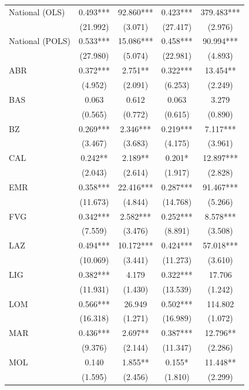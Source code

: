\documentclass[12pt]{article}
\begin{document}
\begin{appendices}
\begin{longtable}{@{}lcccc@{}}
            National (OLS) & 0.493*** & 92.860*** & 0.423*** & 379.483*** \\ 
             & (21.992) & (3.071) & (27.417) & (2.976) \\ 
            National (POLS) & 0.533*** & 15.086*** & 0.458*** & 90.994*** \\ 
             & (27.980) & (5.074) & (22.981) & (4.893) \\ 
            ABR & 0.372*** & 2.751** & 0.322*** & 13.454** \\ 
             & (4.952) & (2.091) & (6.253) & (2.249) \\ 
            BAS & 0.063 & 0.612 & 0.063 & 3.279 \\ 
             & (0.565) & (0.772) & (0.615) & (0.890) \\ 
            BZ & 0.269*** & 2.346*** & 0.219*** & 7.117*** \\ 
             & (3.467) & (3.683) & (4.175) & (3.961) \\ 
            CAL & 0.242** & 2.189** & 0.201* & 12.897*** \\ 
             & (2.043) & (2.614) & (1.917) & (2.828) \\ 
            EMR & 0.358*** & 22.416*** & 0.287*** & 91.467*** \\ 
             & (11.673) & (4.844) & (14.768) & (5.266) \\ 
            FVG & 0.342*** & 2.582*** & 0.252*** & 8.578*** \\ 
             & (7.559) & (3.476) & (8.891) & (3.508) \\ 
            LAZ & 0.494*** & 10.172*** & 0.424*** & 57.018*** \\ 
             & (10.069) & (3.441) & (11.273) & (3.610) \\ 
            LIG & 0.382*** & 4.179 & 0.322*** & 17.706 \\ 
             & (11.931) & (1.430) & (13.539) & (1.242) \\ 
            LOM & 0.566*** & 26.949 & 0.502*** & 114.802 \\ 
             & (16.318) & (1.271) & (16.989) & (1.072) \\ 
            MAR & 0.436*** & 2.697** & 0.387*** & 12.796** \\ 
             & (9.376) & (2.144) & (11.347) & (2.286) \\ 
            MOL & 0.140 & 1.855** & 0.155* & 11.448** \\ 
             & (1.595) & (2.456) & (1.810) & (2.299) \\ 

\end{longtable}
\end{appendices}
\end{document}
